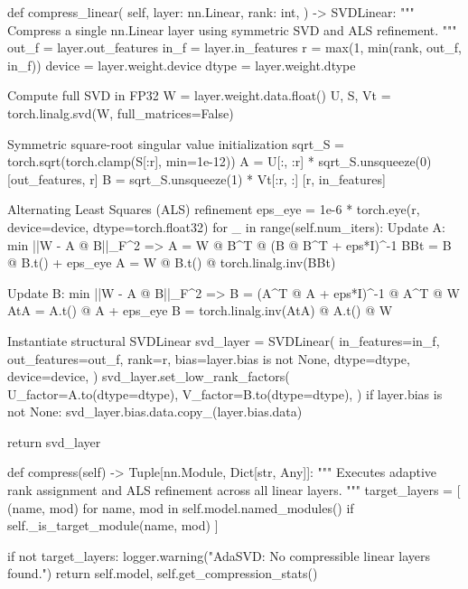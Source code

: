     def compress\_linear(
        self,
        layer: nn.Linear,
        rank: int,
    ) -> SVDLinear:
        """
        Compress a single nn.Linear layer using symmetric SVD and ALS refinement.
        """
        out\_f = layer.out\_features
        in\_f = layer.in\_features
        r = max(1, min(rank, out\_f, in\_f))
        device = layer.weight.device
        dtype = layer.weight.dtype

         Compute full SVD in FP32
        W = layer.weight.data.float()
        U, S, Vt = torch.linalg.svd(W, full\_matrices=False)

         Symmetric square-root singular value initialization
        sqrt\_S = torch.sqrt(torch.clamp(S[:r], min=1e-12))
        A = U[:, :r] * sqrt\_S.unsqueeze(0)        [out\_features, r]
        B = sqrt\_S.unsqueeze(1) * Vt[:r, :]       [r, in\_features]

         Alternating Least Squares (ALS) refinement
        eps\_eye = 1e-6 * torch.eye(r, device=device, dtype=torch.float32)
        for \_ in range(self.num\_iters):
             Update A: min ||W - A @ B||\_F^2 => A = W @ B^T @ (B @ B^T + eps*I)^-1
            BBt = B @ B.t() + eps\_eye
            A = W @ B.t() @ torch.linalg.inv(BBt)

             Update B: min ||W - A @ B||\_F^2 => B = (A^T @ A + eps*I)^-1 @ A^T @ W
            AtA = A.t() @ A + eps\_eye
            B = torch.linalg.inv(AtA) @ A.t() @ W

         Instantiate structural SVDLinear
        svd\_layer = SVDLinear(
            in\_features=in\_f,
            out\_features=out\_f,
            rank=r,
            bias=layer.bias is not None,
            dtype=dtype,
            device=device,
        )
        svd\_layer.set\_low\_rank\_factors(
            U\_factor=A.to(dtype=dtype),
            V\_factor=B.to(dtype=dtype),
        )
        if layer.bias is not None:
            svd\_layer.bias.data.copy\_(layer.bias.data)

        return svd\_layer

    def compress(self) -> Tuple[nn.Module, Dict[str, Any]]:
        """
        Executes adaptive rank assignment and ALS refinement across all linear layers.
        """
        target\_layers = [
            (name, mod)
            for name, mod in self.model.named\_modules()
            if self.\_is\_target\_module(name, mod)
        ]

        if not target\_layers:
            logger.warning("AdaSVD: No compressible linear layers found.")
            return self.model, self.get\_compression\_stats()

